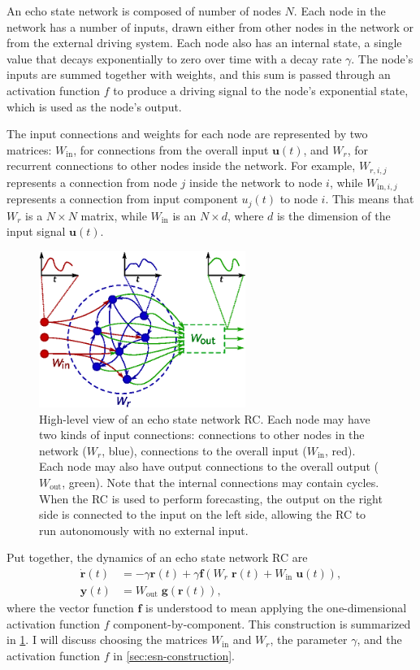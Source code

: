 An echo state network is composed of number of nodes $N$. Each node in
the network has a number of inputs, drawn either from other nodes in
the network or from the external driving system. Each node also has an
internal state, a single value that decays exponentially to zero over
time with a decay rate $\gamma$. The node's inputs are summed together
with weights, and this sum is passed through an activation function
$f$ to produce a driving signal to the node's exponential state, which
is used as the node's output.

The input connections and weights for each node are represented by two
matrices: $W_\text{in}$, for connections from the overall input
$\bm{u}(t)$, and $W_r$, for recurrent connections to other nodes
inside the network. For example, $W_{r,i,j}$ represents a connection
from node $j$ inside the network to node $i$, while
$W_{\text{in},i,j}$ represents a connection from input component
$u_j(t)$ to node $i$. This means that $W_r$ is a $N \times N$ matrix,
while $W_\text{in}$ is an $N \times d$, where $d$ is the dimension of
the input signal $\bm{u}(t)$.

\begin{figure}
  \includegraphics[width=0.6\textwidth]{figures/reservoir}
  \caption{High-level view of an echo state network RC. Each node may
    have two kinds of input connections: connections to other nodes in
    the network ($W_r$, blue), connections to the overall input
    ($W_\text{in}$, red). Each node may also have output connections
    to the overall output ($W_\text{out}$, green). Note that the
    internal connections may contain cycles.  When the RC is used to
    perform forecasting, the output on the right side is connected to
    the input on the left side, allowing the RC to run autonomously
    with no external input.}%
  \label{fig:reservoir}
\end{figure}

Put together, the dynamics of an echo state network RC are
\begin{align}
  \label{eq:esn}
  \dot{\bm{r}}(t) &= - \gamma \bm{r}(t) + \gamma \bm{f}\left( W_r\;\bm{r}(t) + W_\text{in}\;\bm{u}(t) \right), \\
  \bm{y}(t) &= W_\text{out}\;\bm{g}\left(\bm{r}(t)\right), \nonumber
\end{align}
where the vector function $\bm{f}$ is understood to mean applying the
one-dimensional activation function $f$ component-by-component. This
construction is summarized in \cref{fig:reservoir}. I will discuss
choosing the matrices $W_\text{in}$ and $W_r$, the parameter $\gamma$,
and the activation function $f$ in \cref{sec:esn-construction}.

